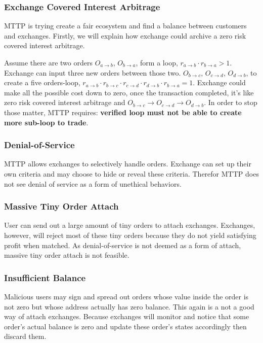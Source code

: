 \documentclass[UTF8,nofonts]{article}
\begin{document}
\subsubsection{Exchange Covered Interest Arbitrage}

MTTP is trying create a fair ecosystem and find a balance between customers and exchanges. Firstly,  we will explain how exchange could archive a zero risk covered interest arbitrage.

Assume there are two orders $O_{a\rightarrow b}$, $O_{b\rightarrow a}$, form a loop, $r_{a\rightarrow b} \cdot r_{b\rightarrow a} > 1$. Exchange can input three new orders between those two. $O_{b\rightarrow c}$, $O_{c\rightarrow d}$, $O_{d\rightarrow b}$, to create a five orders-loop,  $r_{a\rightarrow b} \cdot r_{b\rightarrow c} \cdot r_{c\rightarrow d}\cdot r_{d\rightarrow b}\cdot r_{b\rightarrow a} = 1$. Exchange could make all the possible cost down to zero, once the transaction completed, it's like zero risk covered interest arbitrage
and $O_{b\rightarrow c}\rightarrow O_{c\rightarrow d}\rightarrow O_{d\rightarrow b}$. In order to stop those matter, MTTP requires: {\bfseries verified loop must not be able to create more sub-loop to trade}.

\subsubsection{Denial-of-Service}

MTTP allows exchanges to selectively handle orders. Exchange can set up their own criteria and may choose to hide or reveal these criteria. Therefor MTTP does not see denial of service as a form of unethical behaviors.

\subsubsection{Massive Tiny Order Attach}
User can send out a large amount of tiny orders to attach exchanges. Exchanges, however, will reject most of these tiny orders because they do not yield satisfying profit when matched. As denial-of-service is not deemed as a form of attach, massive tiny order attach is not feasible.

\subsubsection{Insufficient Balance}

Malicious users may sign and spread out orders whose value inside the order is not zero but whose address actually has zero balance. This again is a not a good way of attach exchanges. Because exchanges will monitor and notice that some order's actual balance is zero and update these order's states accordingly then discard them.  
\end{document}
